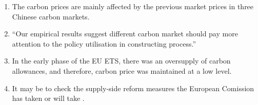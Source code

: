 \begin{enumerate}[wide, itemsep=0cm, topsep=0cm, label=\textbf{\arabic{enumi}.}]
	\item The carbon prices are mainly affected by the previous market prices \cite{wen2022china} in three Chinese carbon markets.
	
	\item ``Our empirical results suggest different carbon market should pay more attention to the policy utilisation in constructing process.'' \cite[p.8]{wen2022china}
	
	\item In the early phase of the EU ETS, there was an oversupply of carbon allowances, and therefore, carbon price was maintained at a low level. \cite{dong2022exploring}
	
	\item It may be to check the supply-side reform measures the European Comission has taken or will take \cite{hintermayer2020reforms}.
	

\end{enumerate}
